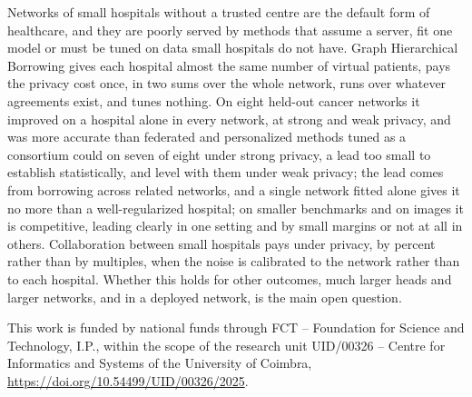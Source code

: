 \documentclass[acmsmall,screen,review]{acmart}
\theoremstyle{acmdefinition}
\begin{document}
Networks of small hospitals without a trusted centre are the default form of healthcare, and they are poorly served by methods that assume a server, fit one model or must be tuned on data small hospitals do not have. Graph Hierarchical Borrowing gives each hospital almost the same number of virtual patients, pays the privacy cost once, in two sums over the whole network, runs over whatever agreements exist, and tunes nothing. On eight held-out cancer networks it improved on a hospital alone in every network, at strong and weak privacy, and was more accurate than federated and personalized methods tuned as a consortium could on seven of eight under strong privacy, a lead too small to establish statistically, and level with them under weak privacy; the lead comes from borrowing across related networks, and a single network fitted alone gives it no more than a well-regularized hospital; on smaller benchmarks and on images it is competitive, leading clearly in one setting and by small margins or not at all in others. Collaboration between small hospitals pays under privacy, by percent rather than by multiples, when the noise is calibrated to the network rather than to each hospital. Whether this holds for other outcomes, much larger heads and larger networks, and in a deployed network, is the main open question.

\begin{acks}
This work is funded by national funds through FCT -- Foundation for Science and Technology, I.P., within the scope of the research unit UID/00326 -- Centre for Informatics and Systems of the University of Coimbra, \url{https://doi.org/10.54499/UID/00326/2025}.
\end{acks}



\end{document}

